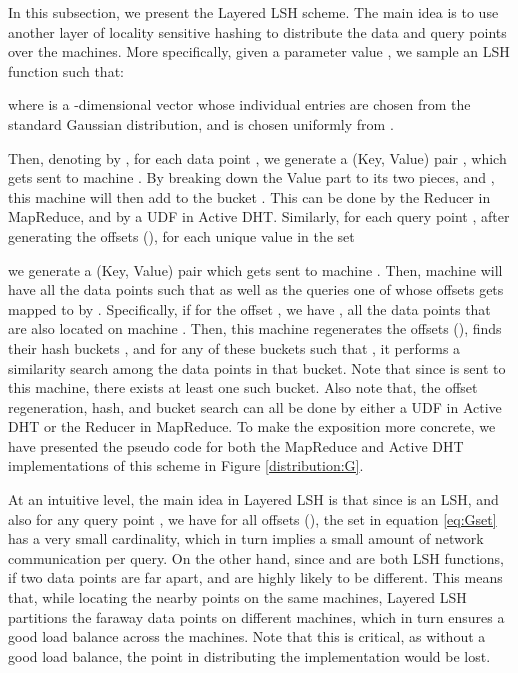\documentclass{acm_proc_article-sp}
\numberwithin{equation}{section}
\numberwithin{figure}{section}
\begin{document}
In this subsection, we present the Layered LSH scheme. The main idea is to use another layer of locality sensitive hashing to distribute the data and query points over the machines. More specifically, given a parameter value , we sample an LSH function  such that:



where  is a -dimensional vector whose individual entries are chosen from the standard Gaussian  distribution, and  is chosen uniformly from .

Then, denoting  by , for each data point , we generate a (Key, Value) pair , which gets sent to machine . By breaking down the Value part to its two pieces,  and , this machine will then add  to the bucket . This can be done by the Reducer in MapReduce, and by a UDF in Active DHT. Similarly, for each query point , after generating the offsets  (), for each unique value  in the set

we generate a (Key, Value) pair  which gets sent to machine . Then, machine  will have all the data points  such that  as well as the queries  one of whose offsets gets mapped to  by . Specifically, if for the offset , we have , all the data points  that  are also located on machine . Then, this machine regenerates the offsets  (), finds their hash buckets , and for any of these buckets such that , it performs a similarity search among the data points in that bucket. Note that since  is sent to this machine, there exists at least one such bucket. Also note that, the offset regeneration, hash, and bucket search can all be done by either a UDF in Active DHT or the Reducer in MapReduce. To make the exposition more concrete, we have presented the pseudo code for both the MapReduce and Active DHT implementations of this scheme in Figure \ref{distribution:G}. 

At an intuitive level, the main idea in Layered LSH is that since  is an LSH, and also for any query point , we have  for all offsets  (), the set in equation \ref{eq:Gset} has a very small cardinality, which in turn implies a small amount of network communication per query. On the other hand, since  and  are both LSH functions, if two data points  are far apart,  and  are highly likely to be different. This means that, while locating the nearby points on the same machines, Layered LSH partitions the faraway data points on different machines, which in turn ensures a good load balance across the machines. Note that this is critical, as without a good load balance, the point in distributing the implementation would be lost.
\end{document}
